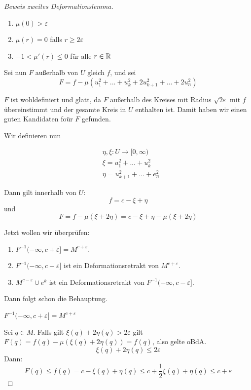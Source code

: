 \begin{proof}[Beweis zweites Deformationslemma]
    \begin{enumerate}
        \item $ \mu(0) > \varepsilon $
        \item $ \mu(r) = 0 $ falls $ r \geq 2 \varepsilon $
        \item $ -1 < \mu'(r) \leq 0 $ für alle $ r \in { \mathbb R } $
    \end{enumerate}

    Sei nun $F$ außerhalb von $U$ gleich $f$, und sei
    \[ F = f - \mu(u_1^2 + ... + u_k^2 + 2u_{k+1}^2 + ... + 2u_n^2) \]

    $F$ ist wohldefiniert und glatt, da $F$ außerhalb des Kreises mit Radius 
    $\sqrt{2\varepsilon}$ mit $f$ übereinstimmt und der gesamte Kreis in $U$ 
    enthalten ist. Damit haben wir einen guten Kandidaten foür $F$ gefunden.

    Wir definieren nun

    \begin{align*}
        & \eta, \xi: U \to [0, \infty) \\
        & \xi = u_1^2 + ... + u_k^2 \\
        & \eta = u_{k + 1}^2 + ... + e_n^2
    \end{align*}

    Dann gilt innerhalb von $U$:
    \[ f = c - \xi + \eta \]
    und 
    \[ F = f - \mu(\xi + 2 \eta) = c - \xi + \eta - \mu(\xi + 2 \eta) \]

    Jetzt wollen wir überprüfen:
    \begin{enumerate}
        \item $F^{-1}(-\infty, c + \varepsilon] = M^{c + \varepsilon}$.
        \item $F^{-1}(-\infty, c - \varepsilon]$ ist ein Deformationsretrakt von 
            $M^{c + \varepsilon}$.
        \item $M^{c - \varepsilon} \cup e^k$ ist ein Deformationsretrakt von
            $F^{-1}(-\infty, c - \varepsilon]$.
    \end{enumerate}

    Dann folgt schon die Behauptung.

     $F^{-1}(-\infty, c + \varepsilon] = M^{c + \varepsilon}$

    Sei $q \in M$. Falls gilt $\xi(q) + 2 \eta(q) > 2 \varepsilon$ gilt 
    $F(q) = f(q) - \mu(\xi(q) + 2\eta(q)) = f(q)$,
    also gelte oBdA.
    \[ \xi(q) + 2 \eta(q) \leq 2 \varepsilon \]
    Dann:
    \[ F(q) \leq f(q) = c - \xi(q) + \eta(q) \leq c + \frac{1}{2}\xi(q) + \eta(q) \leq c + \varepsilon \]
    \sectiondone


\end{proof}
